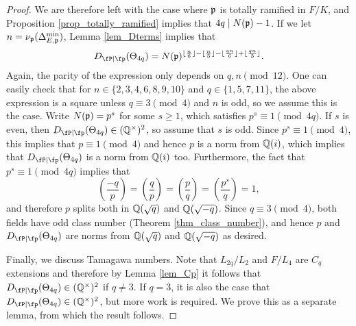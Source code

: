 \begin{proof}
    We are therefore left with the case where $\mathfrak{p}$ is totally ramified in $F/K$, and Proposition \ref{prop_totally_ramified} implies that $4q\mid N(\mathfrak{p})-1$. If we let $n=\nu_{\mathfrak{p}}(\Delta_{E,\mathfrak{p}}^{\min})$, Lemma \ref{lem_Dterms} implies that 
    \begin{equation*}\label{eqn_DtermsC4p}
        \Dp(\Theta_{4q})=N(\pp)^{\floor{\frac{n}{6}}-\floor{\frac{n}{3}}-\floor{\frac{qn}{6}}+\floor{\frac{qn}{3}}}.
    \end{equation*}
    Again, the parity of the expression only depends on $q,n\pmod{12}$. One can easily check that for $n\in\{2,3,4,6,8,9,10\}$ and $q\in\{1,5,7,11\}$, the above expression is a square unless $q\equiv 3\pmod{4}$ and $n$ is odd, so we assume this is the case. Write $N(\mathfrak{p})=p^s$ for some $s\geq1$, which satisfies $p^s\equiv1\pmod{4q}$. If $s$ is even, then $\Dp(\Theta_{4q})\in\QQss$, so assume that $s$ is odd. Since $p^s\equiv1\pmod{4}$, this implies that $p\equiv1\pmod{4}$ and hence $p$ is a norm from $\mathbb{Q}(i)$, which implies that $\Dp(\Theta_{4q})$ is a norm from $\mathbb{Q}(i)$ too. Furthermore, the fact that $p^s\equiv1\pmod{4q}$ implies that
    $$\left(\frac{-q}{p}\right)=\left(\frac{q}{p}\right)=\left(\frac{p}{q}\right)=\left(\frac{p^s}{q}\right)=1,$$
    and therefore $p$ splits both in $\mathbb{Q}(\sqrt{q})$ and $\mathbb{Q}(\sqrt{-q})$. Since $q\equiv3\pmod{4}$, both fields have odd class number (Theorem \ref{thm_class_number}), and hence $p$ and $\Dp(\Theta_{4q})$ are norms from $\mathbb{Q}(\sqrt{q})$ and $\mathbb{Q}(\sqrt{-q})$ as desired. 

    Finally, we discuss Tamagawa numbers. Note that $L_{2q}/L_2$ and $F/L_4$ are $C_q$ extensions and therefore by Lemma \ref{lem_Cp} it follows that $\Dp(\Theta_{4q})\in\QQss$ if $q\neq3$. If $q=3$, it is also the case that $\Dp(\Theta_{4q})\in\QQss$, but more work is required. We prove this as a separate lemma, from which the result follows.    
\end{proof}

